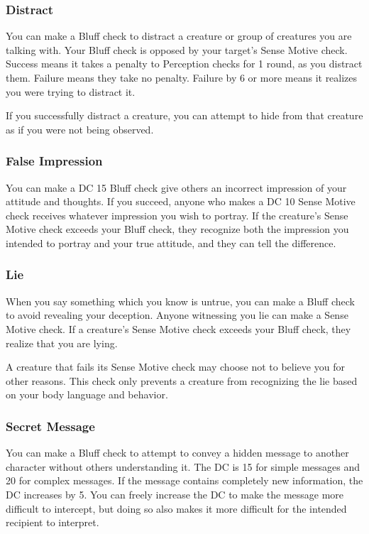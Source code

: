 \subsubsection{Distract}
You can make a Bluff check to distract a creature or group of creatures you are talking with. Your Bluff check is opposed by your target's Sense Motive check. Success means it takes a  penalty to Perception checks for 1 round, as you distract them. Failure means they take no penalty. Failure by 6 or more means it realizes you were trying to distract it.

If you successfully distract a creature, you can attempt to hide from that creature as if you were not being observed.

\subsubsection{False Impression}
You can make a DC 15 Bluff check give others an incorrect impression of your attitude and thoughts. If you succeed, anyone who makes a DC 10 Sense Motive check receives whatever impression you wish to portray. If the creature's Sense Motive check exceeds your Bluff check, they recognize both the impression you intended to portray and your true attitude, and they can tell the difference.

\subsubsection{Lie}
When you say something which you know is untrue, you can make a Bluff check to avoid revealing your deception. Anyone witnessing you lie can make a Sense Motive check. If a creature's Sense Motive check exceeds your Bluff check, they realize that you are lying.

A creature that fails its Sense Motive check may choose not to believe you for other reasons. This check only prevents a creature from recognizing the lie based on your body language and behavior.


\subsubsection{Secret Message}
You can make a Bluff check to attempt to convey a hidden message to another character without others understanding it. The DC is 15 for simple messages and 20 for complex messages. If the message contains completely new information, the DC increases by 5. You can freely increase the DC to make the message more difficult to intercept, but doing so also makes it more difficult for the intended recipient to interpret.

